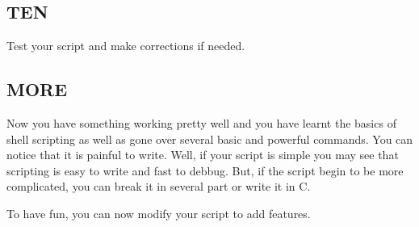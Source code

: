 \subsection{TEN}
Test your script and make corrections if needed.

\subsection{MORE}
Now you have something working pretty well and you have learnt the basics of shell scripting as well as gone over several basic and powerful commands.
You can notice that it is painful to write. Well, if your script is simple you may see that scripting is easy to write and fast to debbug.
But, if the script begin to be more complicated, you can break it in several part or write it in C.

To have fun, you can now modify your script to add features.
